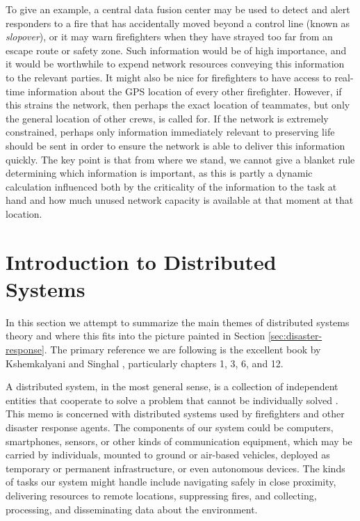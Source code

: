 \documentclass[]             %
{NASA}                       %
\theoremstyle{definition}
\begin{document}
To give an example, a central data fusion center may be used to detect
and alert responders to a fire that has accidentally moved beyond a
control line (known as \emph{slopover}), or it may warn firefighters
when they have strayed too far from an escape route or safety
zone. Such information would be of high importance, and it would be
worthwhile to expend network resources conveying this information to
the relevant parties. It might also be nice for firefighters to have
access to real-time information about the GPS location of every other
firefighter. However, if this strains the network, then perhaps the
exact location of teammates, but only the general location of other
crews, is called for. If the network is extremely constrained, perhaps
only information immediately relevant to preserving life should be
sent in order to ensure the network is able to deliver this
information quickly. The key point is that from where we stand, we
cannot give a blanket rule determining which information is important,
as this is partly a dynamic calculation influenced both by the
criticality of the information to the task at hand and how much unused
network capacity is available at that moment at that location.


\section{Introduction to Distributed Systems}
\label{sec:background}
In this section we attempt to summarize the main themes of distributed
systems theory and where this fits into the picture painted in Section
\ref{sec:disaster-response}. The primary reference we are following is
the excellent book by Kshemkalyani and Singhal
\cite{kshemkalyani_singhal_2008}, particularly chapters 1, 3, 6, and
12.

A distributed system, in the most general sense, is a collection of
independent entities that cooperate to solve a problem that cannot be
individually solved \cite{kshemkalyani_singhal_2008}. This memo is
concerned with distributed systems used by firefighters and other
disaster response agents. The components of our system could be
computers, smartphones, sensors, or other kinds of communication
equipment, which may be carried by individuals, mounted to ground or
air-based vehicles, deployed as temporary or permanent infrastructure,
or even autonomous devices. The kinds of tasks our system might handle
include navigating safely in close proximity, delivering resources to
remote locations, suppressing fires, and collecting, processing, and
disseminating data about the environment.
\end{document}

